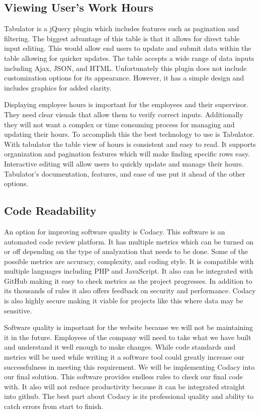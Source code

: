\documentclass[letterpaper,10pt,titlepage,journal,compsoc,draftclsnofoot,onecolumn]{IEEEtran}
\newcommand\tab[1][1cm]{\hspace*{#1}}
\begin{document}
\subsection{Viewing User's Work Hours}

Tabulator is a jQuery plugin which includes features such as pagination and filtering. The biggest advantage of this table is that it allows for direct table input editing. This would allow end users to update and submit data within the table allowing for quicker updates. The table accepts a wide range of data inputs including Ajax, JSON, and HTML. Unfortunately this plugin does not include customization options for its appearance. However, it has a simple design and includes graphics for added clarity. \newline

\tab Displaying employee hours is important for the employees and their supervisor. They need clear visuals that allow them to verify correct inputs. Additionally they will not want a complex or time consuming process for managing and updating their hours. To accomplish this the best technology to use is Tabulator. With tabulator the table view of hours is consistent and easy to read. It supports organization and pagination features which will make finding specific rows easy. Interactive editing will allow users to quickly update and manage their hours. Tabulator’s documentation, features, and ease of use put it ahead of the other options.

\subsection{Code Readability}

\tab An option for improving software quality is Codacy. This software is an automated code review platform. It has multiple metrics which can be turned on or off depending on the type of analyzation that needs to be done. Some of the possible metrics are accuracy, complexity, and coding style. It is compatible with multiple languages including PHP and JavaScript. It also can be integrated with GitHub making it easy to check metrics as the project progresses. In addition to its thousands of rules it also offers feedback on security and performance. Codacy is also highly secure making it viable for projects like this where data may be sensitive. \newline

\tab Software quality is important for the website because we will not be maintaining it in the future. Employees of the company will need to take what we have built and understand it well enough to make changes. While code standards and metrics will be used while writing it a software tool could greatly increase our successfulness in meeting this requirement. We will be implementing Codacy into our final solution. This software provides endless rules to check our final code with. It also will not reduce productivity because it can be integrated straight into github. The best part about Codacy is its professional quality and ability to catch errors from start to finish.
\end{document}

